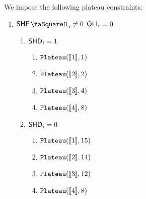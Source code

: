 We impose the following plateau constraints:
\begin{enumerate}
	\item \If $\shfStamp_{i} \neq 0$ \et $\textsf{OLI}_{i} = 0$ \Then
	\begin{enumerate}
		\item \If $\textsf{SHD}_{i} = 1$ \Then 
		\begin{enumerate}
			\item $\texttt{Plateau}([\![1]\!], 1)$ 
			\item $\texttt{Plateau}([\![2]\!], 2)$
			\item $\texttt{Plateau}([\![3]\!], 4)$
			\item $\texttt{Plateau}([\![4]\!], 8)$
		\end{enumerate}
		\item \If $\textsf{SHD}_{i} = 0$ \Then 
		\begin{enumerate}
			\item $\texttt{Plateau}([\![1]\!], 15)$ 
			\item $\texttt{Plateau}([\![2]\!], 14)$
			\item $\texttt{Plateau}([\![3]\!], 12)$
			\item $\texttt{Plateau}([\![4]\!], 8)$
		\end{enumerate}
	\end{enumerate}
\end{enumerate}